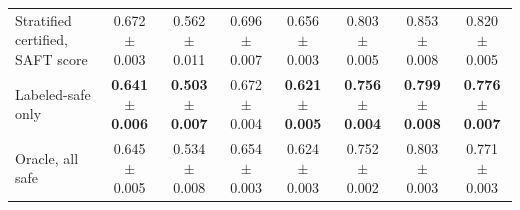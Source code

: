 \begin{tabular}{lccccccc}
Stratified certified, SAFT score & 0.672 $\pm$ 0.003 & 0.562 $\pm$ 0.011 & 0.696 $\pm$ 0.007 & 0.656 $\pm$ 0.003 & 0.803 $\pm$ 0.005 & 0.853 $\pm$ 0.008 & 0.820 $\pm$ 0.005 \\
Labeled-safe only & \textbf{0.641 $\pm$ 0.006} & \textbf{0.503 $\pm$ 0.007} & 0.672 $\pm$ 0.004 & \textbf{0.621 $\pm$ 0.005} & \textbf{0.756 $\pm$ 0.004} & \textbf{0.799 $\pm$ 0.008} & \textbf{0.776 $\pm$ 0.007} \\
Oracle, all safe & 0.645 $\pm$ 0.005 & 0.534 $\pm$ 0.008 & 0.654 $\pm$ 0.003 & 0.624 $\pm$ 0.003 & 0.752 $\pm$ 0.002 & 0.803 $\pm$ 0.003 & 0.771 $\pm$ 0.003 \\
\bottomrule
\end{tabular}

